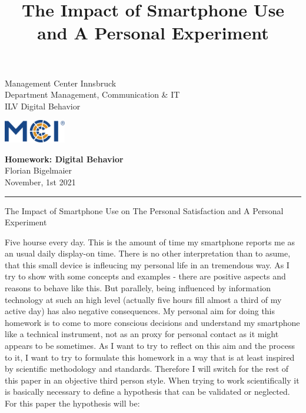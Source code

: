 \documentclass[11pt,letterpaper]{article}
\newcommand{\fontsmall}{\fontsize{7pt}{10pt}\selectfont}
\newcommand{\fontnormal}{\fontsize{11pt}{16pt}\selectfont}
\newcommand{\headline}{\fontsize{17pt}{26pt}\selectfont}
\begin{document}
   \title{The Impact of Smartphone Use and A Personal Experiment} 



\noindent\begin{minipage}{0.5\textwidth}
\fontsmall
Management Center Innsbruck \\
Department Management, Communication \& IT  \\
ILV Digital Behavior


\end{minipage}%
\hfill%
\begin{minipage}{0.3\textwidth}\raggedleft
\includegraphics[height=1.0cm]{mci-logo.png}

\end{minipage}


 
\begin{center}
\textbf{Homework: Digital Behavior}\\   %
Florian Bigelmaier\\                         %
November, 1st 2021\\                         %
\end{center}
\rule{\linewidth}{0.1mm}




\headline \begin{center}
The Impact of Smartphone Use on The Personal Satisfaction and A Personal Experiment
\end{center} 
\fontnormal 
Five hourse every day. This is the amount of time my smartphone reports me as an usual daily display-on time. There is no other interpretation than to asume, that this small device is infleucing my personal life in an tremendous way. As I try to show with some concepts and examples - there are positive aspects and reasons to behave like this. But parallely, being influenced by information technology at such an high level (actually five hours fill almost a third of my active day) has also negative consequences. My personal aim for doing this homework is to come to more conscious decisions and understand my smartphone like a technical instrument, not as an proxy for personal contact as it might appears to be sometimes. As I want to try to reflect on this aim and the process to it, I want to try to formulate this homework in a way that is at least inspired by scientific methodology and standards. Therefore I will switch for the rest of this paper in an objective third person style. When trying to work scientifically it is basically necessary to define a hypothesis that can be validated or neglected. For this paper the hypothesis will be:
\end{document}
